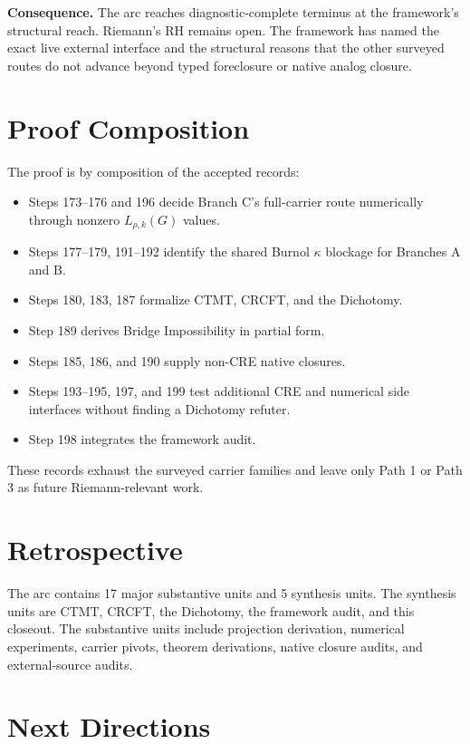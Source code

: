 \documentclass[11pt]{article}
\begin{document}
\textbf{Consequence.}
The arc reaches diagnostic-complete terminus at the framework's structural
reach.  Riemann's RH remains open.  The framework has named the exact live
external interface and the structural reasons that the other surveyed routes
do not advance beyond typed foreclosure or native analog closure.

\section*{Proof Composition}

The proof is by composition of the accepted records:

\begin{itemize}
\item Steps 173--176 and 196 decide Branch C's full-carrier route
numerically through nonzero \(L_{\rho,k}(G)\) values.
\item Steps 177--179, 191--192 identify the shared Burnol \(\kappa\)
blockage for Branches A and B.
\item Steps 180, 183, 187 formalize CTMT, CRCFT, and the Dichotomy.
\item Step 189 derives Bridge Impossibility in partial form.
\item Steps 185, 186, and 190 supply non-CRE native closures.
\item Steps 193--195, 197, and 199 test additional CRE and numerical side
interfaces without finding a Dichotomy refuter.
\item Step 198 integrates the framework audit.
\end{itemize}

These records exhaust the surveyed carrier families and leave only Path 1 or
Path 3 as future Riemann-relevant work.

\section*{Retrospective}

The arc contains 17 major substantive units and 5 synthesis units.  The
synthesis units are CTMT, CRCFT, the Dichotomy, the framework audit, and this
closeout.  The substantive units include projection derivation, numerical
experiments, carrier pivots, theorem derivations, native closure audits, and
external-source audits.

\section*{Next Directions}
\end{document}
